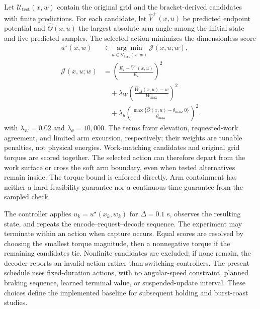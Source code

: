 \documentclass[letterpaper,10pt,conference]{ieeeconf}
\newcommand{\Estar}{E_{\star}}
\begin{document}
Let $\mathcal U_{\mathrm{test}}(x,w)$ contain the original grid and the bracket-derived candidates with finite predictions. For each candidate, let $\widehat V^+(x,u)$ be predicted endpoint potential and $\widehat\Theta(x,u)$ the largest absolute arm angle among the initial state and five predicted samples. The selected action minimizes the dimensionless score
\begin{equation}
\begin{aligned}
 u^\star(x,w)&\in\underset{u\in\mathcal U_{\mathrm{test}}(x,w)}{\arg\min}\ \mathcal J(x,u;w),\\
 \mathcal J(x,u;w)&=\left(\frac{\Estar-\widehat V^+(x,u)}{\Estar}\right)^2\\
 &\quad+\lambda_W\left(\frac{\widehat W_\Delta(x,u)-w}{W_{\max}}\right)^2\\
 &\quad+\lambda_\theta\left(\frac{\max\{\widehat\Theta(x,u)-\theta_{\max},0\}}{\theta_{\max}}\right)^2.
\end{aligned}
\label{eq:score}
\end{equation}
with $\lambda_W=0.02$ and $\lambda_\theta=10{,}000$. The terms favor elevation, requested-work agreement, and limited arm excursion, respectively; their weights are tunable penalties, not physical energies. Work-matching candidates and original grid torques are scored together. The selected action can therefore depart from the work surface or cross the soft arm boundary, even when tested alternatives remain inside. The torque bound is enforced directly. Arm containment has neither a hard feasibility guarantee nor a continuous-time guarantee from the sampled check.

The controller applies $u_k=u^\star(x_k,w_k)$ for $\Delta=0.1$ s, observes the resulting state, and repeats the encode--request--decode sequence. The experiment may terminate within an action when capture occurs. Equal scores are resolved by choosing the smallest torque magnitude, then a nonnegative torque if the remaining candidates tie. Nonfinite candidates are excluded; if none remain, the decoder reports an invalid action rather than switching controllers. The present schedule uses fixed-duration actions, with no angular-speed constraint, planned braking sequence, learned terminal value, or suspended-update interval. These choices define the implemented baseline for subsequent holding and burst-coast studies.
\end{document}
